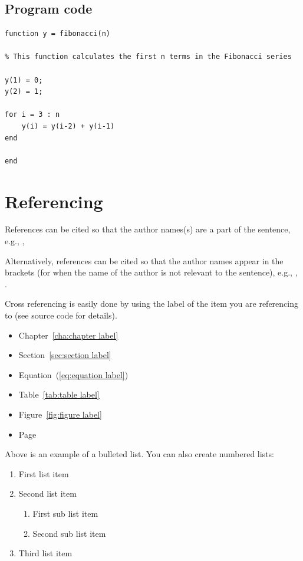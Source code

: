 \subsection{Program code}

\begin{lstlisting}[style=matlabcode,
    caption = A MATLAB function to compute the first $n$ numbers of the Fibonacci series,
    label = mat:fibonacci
    ]
function y = fibonacci(n)

% This function calculates the first n terms in the Fibonacci series

y(1) = 0;
y(2) = 1;

for i = 3 : n
    y(i) = y(i-2) + y(i-1)
end

end
\end{lstlisting}

\section{Referencing}
References can be cited so that the author names(s) are a part of the sentence, e.g., \textcite{stroud:2013}, \textcite{harten:1983}

Alternatively, references can be cited so that the author names appear in the brackets (for when the name of the author is not relevant to the sentence), e.g., \parencite{stroud:2013},  \parencite{harten:1983}.

Cross referencing is easily done by using the label of the item you are referencing to (see source code for details).
\begin{itemize}
	\item Chapter~\ref{cha:chapter label}
	\item Section~\ref{sec:section label}
	\item Equation~(\ref{eq:equation label})
	\item Table~\ref{tab:table label}
	\item Figure~\ref{fig:figure label}
	\item Page~\pageref{eq:equation label}
\end{itemize}

Above is an example of a bulleted list. You can also create numbered lists:
\begin{enumerate}
	\item First list item
	\item Second list item
	\begin{enumerate}
		\item First sub list item
		\item Second sub list item
	\end{enumerate}
	\item Third list item
\end{enumerate}
